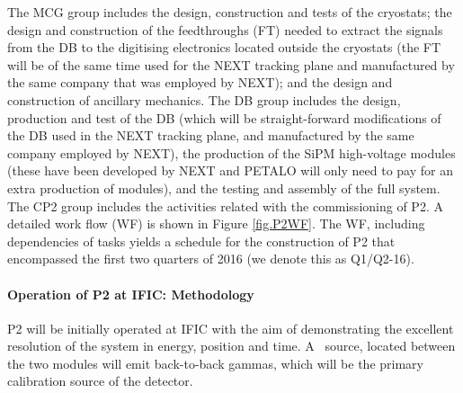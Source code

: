 The MCG group includes the design, construction and tests of the cryostats; the design and construction of the feedthroughs (FT) needed to extract the signals from the DB to the digitising electronics located outside the cryostats (the FT will be of the same time used for the NEXT tracking plane and manufactured by the same company that was employed by NEXT);  and the design and construction of ancillary mechanics. The DB group includes the design, production and test of the DB (which will be straight-forward modifications of the DB used in the NEXT tracking plane, and manufactured by the same company employed by NEXT), the production of the SiPM high-voltage modules (these have been developed by NEXT and PETALO will only need to pay for an extra production of modules), and the testing and assembly of the full system. The CP2 group includes the activities related with the commissioning of P2. A detailed work flow (WF) is shown in Figure \ref{fig.P2WF}. The WF, including dependencies of tasks yields a schedule for the construction of P2 that encompassed the first two quarters of 2016 (we denote this as Q1/Q2-16). 

\paragraph{Operation of P2 at IFIC: Methodology}


P2 will be initially operated at IFIC with the aim of demonstrating the excellent resolution of the system in energy, position and time. A \NA\ source, located between the two modules will emit back-to-back gammas, which will be the primary calibration source of the detector. 

